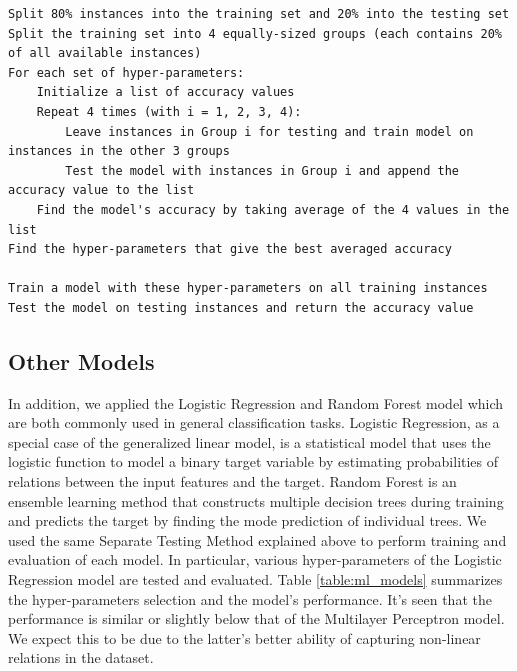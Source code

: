 \documentclass[letterpaper,twocolumn,10pt]{article}
\begin{document}
\begin{lstlisting}[basicstyle=\scriptsize, float=*, label={lst:separate-testing}, caption={Pseudocode for the Separate Testing Procedure}]
Split 80% instances into the training set and 20% into the testing set
Split the training set into 4 equally-sized groups (each contains 20% of all available instances)
For each set of hyper-parameters:
    Initialize a list of accuracy values
    Repeat 4 times (with i = 1, 2, 3, 4):
        Leave instances in Group i for testing and train model on instances in the other 3 groups
        Test the model with instances in Group i and append the accuracy value to the list
    Find the model's accuracy by taking average of the 4 values in the list
Find the hyper-parameters that give the best averaged accuracy

Train a model with these hyper-parameters on all training instances
Test the model on testing instances and return the accuracy value
\end{lstlisting}

\subsection{Other Models}

In addition, we applied the Logistic Regression and Random Forest model which are both commonly used in general classification tasks. Logistic Regression, as a special case of the generalized linear model, is a statistical model that uses the logistic function to model a binary target variable by estimating probabilities of relations between the input features and the target. Random Forest is an ensemble learning method that constructs multiple decision trees during training and predicts the target by finding the mode prediction of individual trees. We used the same Separate Testing Method explained above to perform training and evaluation of each model. In particular, various hyper-parameters of the Logistic Regression model are tested and evaluated. Table \ref{table:ml_models} summarizes the hyper-parameters selection and the model's performance. It's seen that the performance is similar or slightly below that of the Multilayer Perceptron model. We expect this to be due to the latter's better ability of capturing non-linear relations in the dataset.
\end{document}
